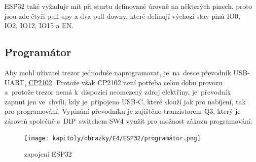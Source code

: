 ESP32 také vyžaduje mít při startu definované úrovně na některých pinech, proto jsou zde čtyři pull-upy a dva pull-downy, které definují výchozí stav
pinů IO0, IO2, IO12, IO15 a EN.  %
\begin{table}[h]
    \centering
    \caption{popis funkce pinů}
    \label{tab:COMPARATION}
\end{table}

\newpage

\subsection*{Programátor}
Aby mohl uživatel trezor jednoduše naprogramovat, je~na~desce převodník USB-UART, \href{https://www.silabs.com/documents/public/data-sheets/cp2102n-datasheet.pdf}{CP2102}.
Protože však CP2102 není potřeba celou dobu provozu a~protože trezor nemá k~dispozici neomezený zdroj elektřiny, je~převodník zapnut jen ve~chvíli, 
kdy je~připojeno USB-C, které slouží jak pro nabíjení, tak pro programování. Vypínání převodníku je zajištěno tranzistorem Q3, který je zároveň společně
s~DIP~switchem SW4 využit pro možnost zákazu programování.

\begin{figure}[htbp] %
    \centering
    \texttt{[image: kapitoly/obrazky/E4/ESP32/programátor.png]}
    \caption{zapojení ESP32}
    \label{fig:E4-step-up}
\end{figure}

\newpage